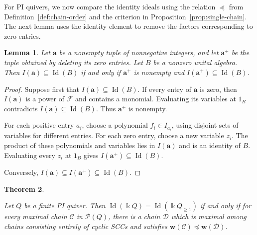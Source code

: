 \documentclass[11pt,reqno]{amsart}
\newcommand{\kk}{\Bbbk}
\newcommand{\F}{\mathcal F}
\newcommand{\Id}{\operatorname{Id}}
\newtheorem{theorem}{Theorem}[section]
\newtheorem{lemma}[theorem]{Lemma}
\theoremstyle{definition}
\theoremstyle{remark}
\numberwithin{equation}{section}
\begin{document}
For PI quivers, we now compare the identity ideals using
the relation $\preceq$ from Definition~\ref{def:chain-order}
and the criterion in Proposition~\ref{prop:single-chain}.
The next lemma uses the identity element to remove
the factors corresponding to zero entries.


\begin{lemma}\label{lem:delete-zero-factors}
Let $\mathbf a$ be a nonempty tuple of nonnegative integers, and let
$\mathbf a^+$ be the tuple obtained by deleting its zero entries.
Let $B$ be a nonzero unital algebra. Then $I(\mathbf a)\subseteq\Id(B)$ if and only if $\mathbf a^+$ is nonempty and
$I(\mathbf a^+)\subseteq\Id(B)$.
\end{lemma}

\begin{proof}
Suppose first that $I(\mathbf a)\subseteq\Id(B)$.
If every entry of $\mathbf a$ is zero, then $I(\mathbf a)$ is
a power of $\F$ and contains a monomial. Evaluating its variables
at $1_B$ contradicts $I(\mathbf a)\subseteq\Id(B)$.
Thus $\mathbf a^+$ is nonempty.

For each positive entry $a_i$, choose a polynomial $f_i\in I_{a_i}$,
using disjoint sets of variables for different entries. For each zero
entry, choose a new variable $z_i$. The product of these polynomials and variables lies in
$I(\mathbf a)$ and is an identity of $B$.
Evaluating every $z_i$ at $1_B$ gives
$I(\mathbf a^+)\subseteq\Id(B)$.

Conversely, $I(\mathbf a)\subseteq I(\mathbf a^+)\subseteq\Id(B)$.

\end{proof}

\begin{theorem}\label{thm:equality}

Let $Q$ be a finite PI quiver. Then
$\Id(\kk Q)=\Id(\kk Q_{\ge1})$ if and only if
for every maximal chain $\mathcal C$ in $\mathcal P(Q)$,
there is a chain $\mathcal D$ which is maximal among chains
consisting entirely of cyclic SCCs and satisfies
$\mathbf w(\mathcal C)\preceq\mathbf w(\mathcal D)$.

\end{theorem}
\end{document}
